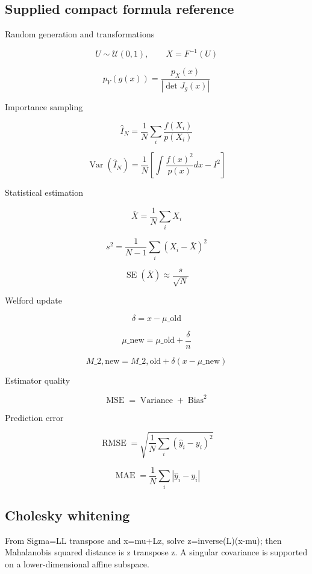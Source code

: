 \subsection{Supplied compact formula reference}\label{appendix-cb5af353ef77-supplied-compact-formula-reference}

\hypertarget{appendix-cb5af353ef77-supplied-compact-formula-reference}{}

Random generation and transformations

\[
 U\sim\mathcal U(0,1),\qquad X=F^{-1}(U) 
\]

\[
 p_Y(g(x)) = \frac{p_X(x)}{|\det J_g(x)|} 
\]

Importance sampling

\[
 \widehat I_N= \frac1N\sum_i\frac{f(X_i)}{p(X_i)} 
\]

\[
 \operatorname{Var}(\widehat I_N) = \frac1N \left[ \int\frac{f(x)^2}{p(x)}dx-I^2 \right] 
\]

Statistical estimation

\[
 \bar X=\frac1N\sum_iX_i 
\]

\[
 s^2=\frac1{N-1}\sum_i(X_i-\bar X)^2 
\]

\[
 \operatorname{SE}(\bar X)\approx\frac{s}{\sqrt N} 
\]

Welford update

\[
 \delta=x-\mu\_{\mathrm{old}} 
\]

\[
 \mu\_{\mathrm{new}}= \mu\_{\mathrm{old}}+\frac{\delta}{n} 
\]

\[
 M\_{2,\mathrm{new}}= M\_{2,\mathrm{old}}+ \delta(x-\mu\_{\mathrm{new}}) 
\]

Estimator quality

\[
 \operatorname{MSE}= \operatorname{Variance}+ \operatorname{Bias}^2 
\]

Prediction error

\[
 \operatorname{RMSE}= \sqrt{\frac1N\sum_i(\hat y_i-y_i)^2} 
\]

\[
 \operatorname{MAE}= \frac1N\sum_i|\hat y_i-y_i| 
\]

\subsection{Cholesky whitening}\label{appendix-cb5af353ef77-cholesky-whitening}

\hypertarget{appendix-cb5af353ef77-cholesky-whitening}{}

From Sigma=LL transpose and x=mu+Lz, solve z=inverse(L)(x-mu); then Mahalanobis squared distance is z transpose z. A singular covariance is supported on a lower-dimensional affine subspace.

